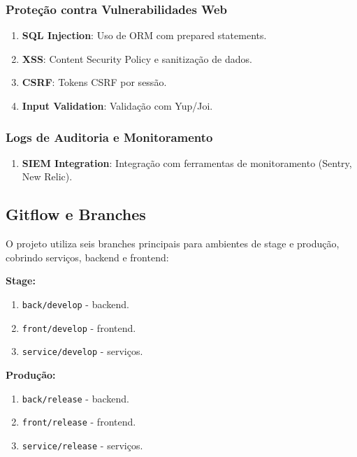 \documentclass[12pt, a4paper]{article}
\begin{document}
\begin{spacing}{1.5}
\begin{spacing}{1.5}
\subsubsection{Proteção contra Vulnerabilidades Web}
\begin{spacing}{1.5}
\begin{enumerate}[label=\alph*)]
    \item \textbf{SQL Injection}: Uso de ORM com prepared statements.
    \item \textbf{XSS}: Content Security Policy e sanitização de dados.
    \item \textbf{CSRF}: Tokens CSRF por sessão.
    \item \textbf{Input Validation}: Validação com Yup/Joi.
\end{enumerate}
\end{spacing}

\subsubsection{Logs de Auditoria e Monitoramento}
\begin{spacing}{1.5}
\begin{enumerate}[label=\alph*)]
     \item \textbf{SIEM Integration}: Integração com ferramentas de monitoramento (Sentry, New Relic).
\end{enumerate}
\end{spacing}

\subsection{Gitflow e Branches}
\begin{spacing}{1.5}
O projeto utiliza seis branches principais para ambientes de stage e produção, cobrindo serviços, backend e frontend:

\textbf{Stage:}
\begin{enumerate}[label=\alph*)]
    \item \texttt{back/develop} - backend.
    \item \texttt{front/develop} - frontend.
    \item \texttt{service/develop} - serviços.
\end{enumerate}

\textbf{Produção:}
\begin{enumerate}[label=\alph*)]
    \item \texttt{back/release} - backend.
    \item \texttt{front/release} - frontend.
    \item \texttt{service/release} - serviços.
\end{enumerate}


\end{spacing}
\end{spacing}
\end{spacing}
\end{document}
